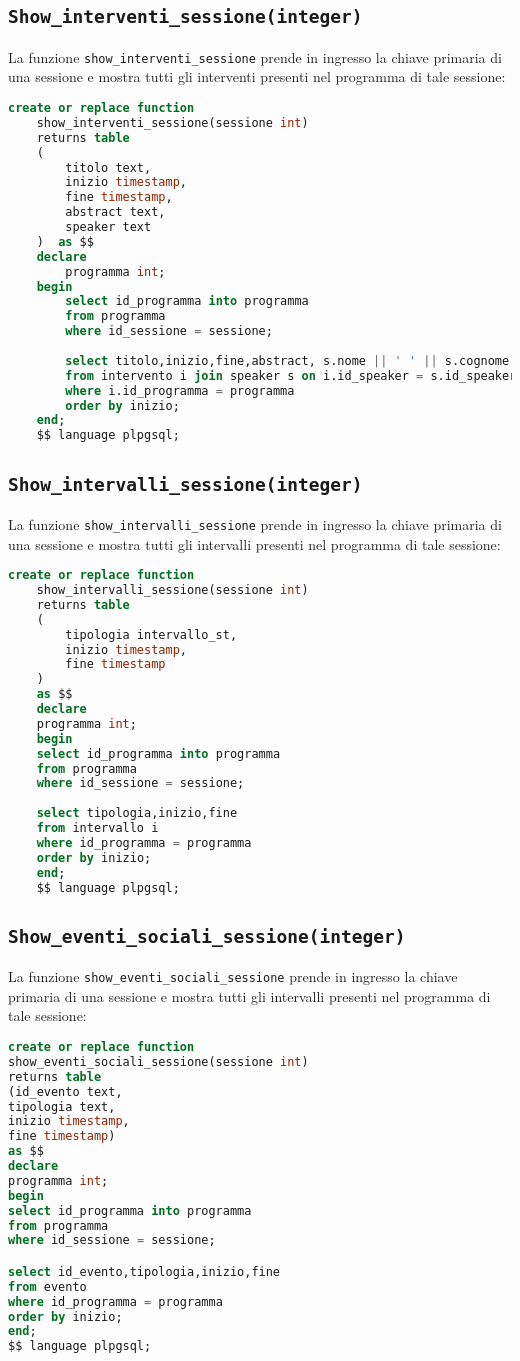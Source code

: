 \subsection{\texttt{Show\_interventi\_sessione(integer)}}
La funzione \texttt{show\_interventi\_sessione} prende in ingresso la chiave primaria di una sessione e mostra tutti gli interventi presenti nel programma di tale sessione:
\begin{lstlisting}[language=SQL, style=mystyle]
	create or replace function 
	show_interventi_sessione(sessione int)
	returns table
	(
		titolo text,
		inizio timestamp,
		fine timestamp,
		abstract text,
		speaker text
	)  as $$
	declare 
		programma int;
	begin
		select id_programma into programma
		from programma
		where id_sessione = sessione;
	
		select titolo,inizio,fine,abstract, s.nome || ' ' || s.cognome as speaker
		from intervento i join speaker s on i.id_speaker = s.id_speaker
		where i.id_programma = programma
		order by inizio;
	end;
	$$ language plpgsql;
\end{lstlisting}
\subsection{\texttt{Show\_intervalli\_sessione(integer)}}
La funzione \texttt{show\_intervalli\_sessione} prende in ingresso la chiave primaria di una sessione e mostra tutti gli intervalli presenti nel programma di tale sessione:
\begin{lstlisting}[language=SQL, style=mystyle]
	create or replace function 
	show_intervalli_sessione(sessione int)
	returns table
	(
		tipologia intervallo_st,
		inizio timestamp,
		fine timestamp
	)  
	as $$
	declare 
	programma int;
	begin
	select id_programma into programma
	from programma
	where id_sessione = sessione;
	
	select tipologia,inizio,fine
	from intervallo i
	where id_programma = programma
	order by inizio;
	end;
	$$ language plpgsql;
\end{lstlisting}
\subsection{\texttt{Show\_eventi\_sociali\_sessione(integer)}}
La funzione \texttt{show\_eventi\_sociali\_sessione} prende in ingresso la chiave primaria di una sessione e mostra tutti gli intervalli presenti nel programma di tale sessione:
\begin{lstlisting}[language=SQL, style=mystyle]
create or replace function 
show_eventi_sociali_sessione(sessione int)
returns table
(id_evento text,
tipologia text,
inizio timestamp,
fine timestamp) 
as $$
declare 
programma int;
begin
select id_programma into programma
from programma
where id_sessione = sessione;

select id_evento,tipologia,inizio,fine
from evento
where id_programma = programma
order by inizio;
end;
$$ language plpgsql;
\end{lstlisting}
